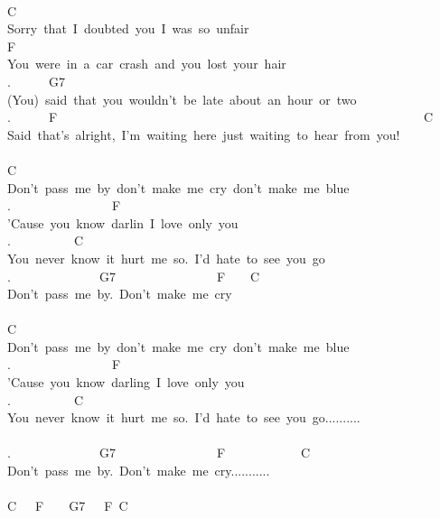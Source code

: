 {\\
C\\
Sorry\ that\ I\ doubted\ you\ I\ was\ so\ unfair\\
F\\
You\ were\ in\ a\ car\ crash\ and\ you\ lost\ your\ hair\ \ \ \ \ \ \\
.\ \ \ \ \ \ G7\ \\
(You)\ said\ that\ you\ wouldn't\ be\ late\ about\ an\ hour\ or\ two\\
.\ \ \ \ \ \ F\ \ \ \ \ \ \ \ \ \ \ \ \ \ \ \ \ \ \ \ \ \ \ \ \ \ \ \ \ \ \ \ \ \ \ \ \ \ \ \ \ \ \ \ \ \ \ \ \ \ \ \ \ \ \ \ \ \ C\ \\
Said\ \;that's\ alright,\ I'm\ waiting\ here\ just\ waiting\ to\ hear\ from\ you!\;\ \\
\\
C\\
Don't\ pass\ me\ by\ don't\ make\ me\ cry\ don't\ make\ me\ blue\\
.\ \ \ \ \ \ \ \ \ \ \ \ \ \ \ \ F\\
'Cause\ you\ know\ darlin\ I\ love\ only\ you\\
.\ \ \ \ \ \ \ \ \ \ C\\
You\ never\ know\ it\ hurt\ me\ so.\ I'd\ hate\ to\ see\ you\ go\\
.\ \ \ \ \ \ \ \ \ \ \ \ \ \ G7\ \ \ \ \ \ \ \ \ \ \ \ \ \ \ \ F\ \ \ \ C\\
Don't\ pass\ me\ by.\ Don't\ make\ me\ cry\ \ \ \ \ \ \\
\\
C\\
Don't\ pass\ me\ by\ don't\ make\ me\ cry\ don't\ make\ me\ blue\\
.\ \ \ \ \ \ \ \ \ \ \ \ \ \ \ \ F\ \\
'Cause\ you\ know\ darling\ I\ love\ only\ you\\
.\ \ \ \ \ \ \ \ \ \ C\ \ \ \ \ \ \ \ \ \ \ \ \ \ \ \ \ \ \ \ \ \ \ \ \ \ \ \ \ \ \ \ \ \ \ \ \ \ \ \ \ \ \ \ \ \ \ \ \\
You\ never\ know\ it\ hurt\ me\ so.\ I'd\ hate\ to\ see\ you\ go..........\\
\ \\
.\ \ \ \ \ \ \ \ \ \ \ \ \ \ G7\ \ \ \ \ \ \ \ \ \ \ \ \ \ \ \ F\ \ \ \ \ \ \ \ \ \ \ \ C\\
Don't\ pass\ me\ by.\ Don't\ make\ me\ cry...........\ \ \ \\
\\
C\ \ \ F\ \ \ \ G7\ \ \ F\ C}
